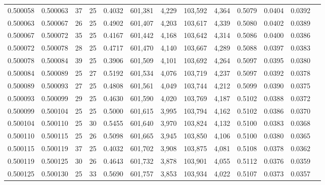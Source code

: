 \begin{tabular}{rrrrrrrrrrrrr}
0.500058 & 0.500063 &    37 &  25 &                                     0.4032 & 601,381 &   4,229 & 103,592 &   4,364 & 0.5079 & 0.0404 & 0.0392 \\
0.500063 & 0.500067 &    26 &  25 &                                     0.4902 & 601,407 &   4,203 & 103,617 &   4,339 & 0.5080 & 0.0402 & 0.0389 \\
0.500067 & 0.500072 &    35 &  25 &                                     0.4167 & 601,442 &   4,168 & 103,642 &   4,314 & 0.5086 & 0.0400 & 0.0386 \\
0.500072 & 0.500078 &    28 &  25 &                                     0.4717 & 601,470 &   4,140 & 103,667 &   4,289 & 0.5088 & 0.0397 & 0.0383 \\
0.500078 & 0.500084 &    39 &  25 &                                     0.3906 & 601,509 &   4,101 & 103,692 &   4,264 & 0.5097 & 0.0395 & 0.0380 \\
0.500084 & 0.500089 &    25 &  27 &                                     0.5192 & 601,534 &   4,076 & 103,719 &   4,237 & 0.5097 & 0.0392 & 0.0378 \\
0.500089 & 0.500093 &    27 &  25 &                                     0.4808 & 601,561 &   4,049 & 103,744 &   4,212 & 0.5099 & 0.0390 & 0.0375 \\
0.500093 & 0.500099 &    29 &  25 &                                     0.4630 & 601,590 &   4,020 & 103,769 &   4,187 & 0.5102 & 0.0388 & 0.0372 \\
0.500099 & 0.500104 &    25 &  25 &                                     0.5000 & 601,615 &   3,995 & 103,794 &   4,162 & 0.5102 & 0.0386 & 0.0370 \\
0.500104 & 0.500110 &    25 &  30 &                                     0.5455 & 601,640 &   3,970 & 103,824 &   4,132 & 0.5100 & 0.0383 & 0.0368 \\
0.500110 & 0.500115 &    25 &  26 &                                     0.5098 & 601,665 &   3,945 & 103,850 &   4,106 & 0.5100 & 0.0380 & 0.0365 \\
0.500115 & 0.500119 &    37 &  25 &                                     0.4032 & 601,702 &   3,908 & 103,875 &   4,081 & 0.5108 & 0.0378 & 0.0362 \\
0.500119 & 0.500125 &    30 &  26 &                                     0.4643 & 601,732 &   3,878 & 103,901 &   4,055 & 0.5112 & 0.0376 & 0.0359 \\
0.500125 & 0.500130 &    25 &  33 &                                     0.5690 & 601,757 &   3,853 & 103,934 &   4,022 & 0.5107 & 0.0373 & 0.0357 \\

\end{tabular}
